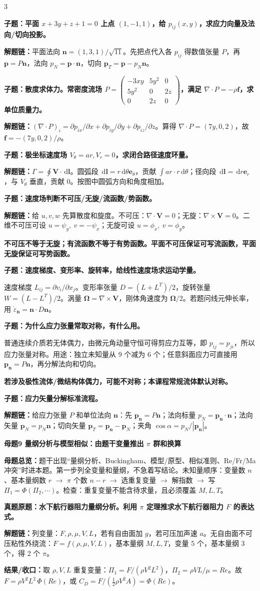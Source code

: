 \documentclass[a4paper]{article}
\newcommand{\mt}[1]{\vspace{0.45pt}\colorbox{M}{\parbox{\dimexpr\linewidth-2\fboxsep}{\color{white}\bfseries #1}}\par}
\newcommand{\qt}[1]{\vspace{0.25pt}\colorbox{Q}{\parbox{\dimexpr\linewidth-2\fboxsep}{\color{white}\bfseries #1}}\par}
\newcommand{\ans}[1]{\colorbox{G}{\parbox{\dimexpr\linewidth-2\fboxsep}{#1}}\par}
\newcommand{\warn}[1]{\colorbox{Y}{\parbox{\dimexpr\linewidth-2\fboxsep}{\color{E}\bfseries #1}}\par}
\newcommand{\chain}[1]{{\color{A}\bfseries 解题链：}#1\par}
\newcommand{\res}[1]{{\color{E}\bfseries 结果/收口：}#1\par}
\newcommand{\dd}{\,\mathrm d}
\newcommand{\mview}[1]{\ans{\textbf{母题总览：}#1}}
\begin{document}
\begin{multicols}{3}
\qt{子题：平面 $x+3y+z+1=0$ 上点 $(1,-1,1)$，给 $p_{ij}(x,y)$，求应力向量及法向/切向投影。}
\chain{平面法向 $\bm n=(1,3,1)/\sqrt{11}$。先把点代入各 $p_{ij}$ 得数值张量 $P$，再 $\bm p=P\bm n$，法向 $p_N=\bm p\cdot\bm n$，切向 $\bm p_T=\bm p-p_N\bm n$。}

\qt{子题：散度求体力。常密度流场 $P=\begin{pmatrix}-3xy&5y^2&0\\5y^2&0&2z\\0&2z&0\end{pmatrix}$，满足 $\nabla\cdot P=-\rho\bm f$，求单位质量力。}
\chain{$(\nabla\cdot P)_i=\partial p_{ix}/\partial x+\partial p_{iy}/\partial y+\partial p_{iz}/\partial z$。算得 $\nabla\cdot P=(7y,0,2)$，故 $\bm f=-(7y,0,2)/\rho$。}

\qt{子题：极坐标速度场 $V_\theta=ar,V_r=0$，求闭合路径速度环量。}
\chain{$\Gamma=\oint\bm V\cdot\dd\bm l$。圆弧段 $\dd\bm l=r\dd\theta\bm e_\theta$，贡献 $\int ar\cdot r\dd\theta$；径向段 $\dd\bm l=\dd r\bm e_r$，与 $V_\theta$ 垂直，贡献 0。按图中圆弧方向和角度相加。}

\qt{子题：速度场判断不可压/无旋/流函数/势函数。}
\chain{给 $u,v,w$ 先算散度和旋度。不可压：$\nabla\cdot\bm V=0$；无旋：$\nabla\times\bm V=0$。二维不可压可设 $u=\psi_y,\ v=-\psi_x$；无旋可设 $u=\phi_x,\ v=\phi_y$。}
\warn{不可压不等于无旋；有流函数不等于有势函数。平面不可压保证可写流函数，平面无旋保证可写势函数。}

\qt{子题：速度梯度、变形率、旋转率，给线性速度场求运动学量。}
\ans{速度梯度 $L_{ij}=\partial v_i/\partial x_j$。变形率张量 $D=(L+L^T)/2$，旋转张量 $W=(L-L^T)/2$。涡量 $\bm\Omega=\nabla\times\bm V$，刚体角速度为 $\bm\Omega/2$。若题问线元伸长率，用 $\dot\varepsilon_{\bm n}=\bm n\cdot D\bm n$。}

\qt{子题：为什么应力张量常取对称，有什么用。}
\ans{普通连续介质若无体偶力，由微元角动量守恒可得剪应力互等，即 $p_{ij}=p_{ji}$，所以应力张量对称。用途：独立未知量从 9 个减为 6 个；任意斜面应力可直接用 $\bm p_{\bm n}=P\bm n$，再分解法向和切向。}
\warn{若涉及极性流体/微结构体偶力，可能不对称；本课程常规流体默认对称。}

\qt{子题：应力矢量分解标准流程。}
\chain{给应力张量 $P$ 和单位法向 $\bm n$：先 $\bm p_{\bm n}=P\bm n$；法向标量 $p_N=\bm p_{\bm n}\cdot\bm n$；法向矢量 $\bm p_N=p_N\bm n$；切向矢量 $\bm p_T=\bm p_{\bm n}-\bm p_N$；夹角 $\cos\alpha=p_N/|\bm p_{\bm n}|$。}


\mt{母题9 量纲分析与模型相似：由题干变量推出 $\pi$ 群和换算}
\mview{题干出现“量纲分析、Buckingham、模型/原型、相似准则、Re/Fr/Ma 冲突”时进本题。第一步列全变量和量纲，不急着写结论。未知量顺序：变量数 $n$、基本量纲数 $r$ $\to$ $\pi$ 个数 $n-r$ $\to$ 选重复变量 $\to$ 解指数 $\to$ 写 $\Pi_1=\Phi(\Pi_2,\cdots)$。检查：重复变量不能含待求量，且必须覆盖 $M,L,T$。}
\qt{真题原题：水下航行器阻力量纲分析。利用 $\pi$ 定理推求水下航行器阻力 $F$ 的表达式。}
\chain{列变量：$F,\rho,\mu,V,L$，若有自由面加 $g$，若可压加声速 $a$。无自由面不可压粘性外绕流：$F=f(\rho,\mu,V,L)$，基本量纲 $M,L,T$，变量 5 个，基本量纲 3 个，得 2 个 $\pi$。}
\res{取 $\rho,V,L$ 重复变量：$\Pi_1=F/(\rho V^2L^2)$，$\Pi_2=\rho VL/\mu=Re$。故 $F=\rho V^2L^2\,\Phi(Re)$，或 $C_D=F/(\frac12\rho V^2A)=\Phi(Re)$。}


\end{multicols}
\end{document}
